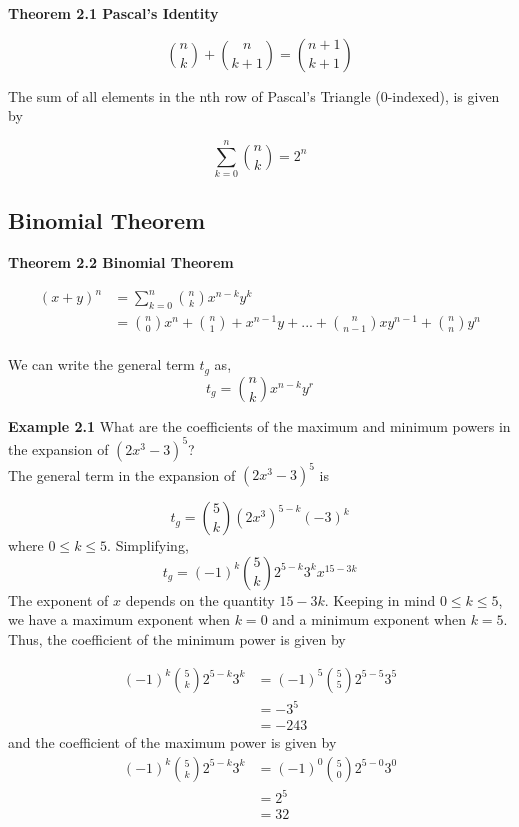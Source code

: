 \documentclass{article}
\begin{document}
\textbf{Theorem 2.1 Pascal's Identity}
\begin{framed}
$${n \choose k} + {n \choose k + 1} = {n + 1 \choose k + 1}$$
\end{framed}
The sum of all elements in the nth row of Pascal's Triangle (0-indexed), is given by 

$$\sum_{k=0}^{n} {n \choose k} = 2^n$$

\bigskip

\subsection{Binomial Theorem}

\textbf{Theorem 2.2 Binomial Theorem}
\begin{framed}
\begin{align*}
    (x+y)^n & = \sum_{k=0}^{n}{n\choose k}x^{n-k}y^k\\ & = {n\choose0}x^n + {n\choose1} + x^{n-1}y + ... + {n\choose n - 1}xy^{n-1} + {n \choose n}y^n \\
\end{align*}
\end{framed}

We can write the general term $t_g$ as,
$$t_g = {n\choose k}x^{n-k}y^r$$

\bigskip

\noindent\textbf{Example 2.1} What are the coefficients of the maximum and minimum powers in the expansion of $(2x^3 - 3)^5$?\\

The general term in the expansion of $(2x^3 -3)^5$ is

$$t_g = {5\choose k}(2x^3)^{5-k}(-3)^k$$ where $0 \leq k \leq 5$. Simplifying,
$$t_g = (-1)^{k}{5\choose k}2^{5-k}3^{k}x^{15-3k}$$
The exponent of $x$ depends on the quantity $15-3k$. Keeping in mind $0 \leq k \leq 5$, we have a maximum exponent when $k = 0$ and a minimum exponent when $k = 5$. Thus, the coefficient of the minimum power is given by

\begin{align*}
    (-1)^{k}{5\choose k}2^{5-k}3^{k} & = (-1)^{5}{5\choose 5}2^{5-5}3^5 \\ & = -3^5 \\ & = -243
\end{align*}
and the coefficient of the maximum power is given by
\begin{align*}
    (-1)^{k}{5\choose k}2^{5-k}3^{k} & = (-1)^{0}{5\choose 0}2^{5-0}3^0 \\ & = 2^5 \\ & = 32
\end{align*}
\end{document}
